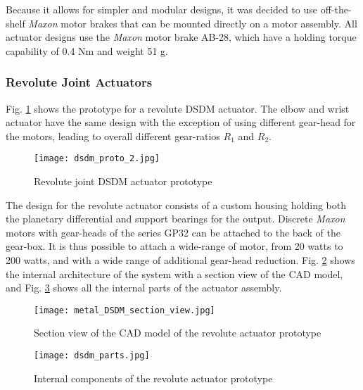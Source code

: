 Because it allows for simpler and modular designs, it was decided to use off-the-shelf \textit{Maxon} motor brakes that can be mounted directly on a motor assembly. All actuator designs use the \textit{Maxon} motor brake AB-28, which have a holding torque capability of 0.4 Nm and weight 51 g. 


\subsubsection{Revolute Joint Actuators}

Fig. \ref{fig:dsdm_act} shows the prototype for a revolute DSDM actuator. The elbow and wrist actuator have the same design with the exception of using different gear-head for the motors, leading to overall different gear-ratios $R_1$ and $R_2$.
%
\begin{figure}[htp]
	\centering
		\texttt{[image: dsdm\_proto\_2.jpg]}
	\caption{Revolute joint DSDM actuator prototype } %
	\label{fig:dsdm_act}
\end{figure}
%
The design for the revolute actuator consists of a custom housing holding both the planetary differential and support bearings for the output. Discrete \textit{Maxon} motors with gear-heads of the series GP32 can be attached to the back of the gear-box. It is thus possible to attach a wide-range of motor, from 20 watts to 200 watts, and with a wide range of additional gear-head reduction. Fig. \ref{fig:dsdm_section} shows the internal architecture of the system with a section view of the CAD model, and Fig. \ref{fig:dsdm_parts} shows all the internal parts of the actuator assembly. 

\begin{figure}[htp]
	\centering
		\texttt{[image: metal\_DSDM\_section\_view.jpg]}
	\caption{Section view of the CAD model of the revolute actuator prototype} %
	\label{fig:dsdm_section}
\end{figure}

\begin{figure}[htbp]
	\centering
		\texttt{[image: dsdm\_parts.jpg]}
	\caption{Internal components of the revolute actuator prototype}
	\label{fig:dsdm_parts}
\end{figure}

